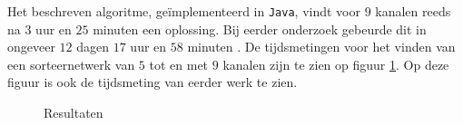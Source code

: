 \documentclass{article}
\begin{document}
Het beschreven algoritme, ge\"implementeerd in \texttt{Java}, vindt voor $9$ kanalen reeds na $3$ uur en $25$ minuten een oplossing.
Bij eerder onderzoek gebeurde dit in ongeveer $12$ dagen $17$ uur en $58$ minuten \cite{sortingNetworksSize2014}.
De tijdsmetingen voor het vinden van een sorteernetwerk van $5$ tot en met $9$ kanalen zijn te zien op figuur \ref{Tijdsresultaten}. Op deze figuur is ook de tijdsmeting van eerder werk te zien.
\begin{figure}[!h]
\centering
{}
\caption{Resultaten}
\label{Tijdsresultaten}
\end{figure}
\end{document}
